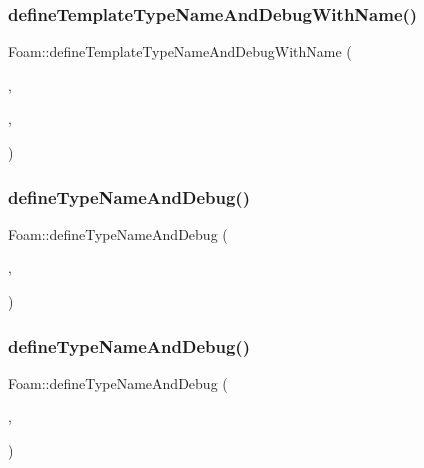 \mbox{\label{namespaceFoam_a8b6880a1c00667344278ee7d0f07e08f}} 
\subsubsection{\texorpdfstring{define\+Template\+Type\+Name\+And\+Debug\+With\+Name()}{defineTemplateTypeNameAndDebugWithName()}}
{\footnotesize\ttfamily Foam\+::define\+Template\+Type\+Name\+And\+Debug\+With\+Name (\begin{DoxyParamCaption}\item[{\hyperlink{namespaceFoam_adbfd1f3f51dc7617aa2c901685a43266}{scalar\+I\+O\+Field\+Field}}]{,  }\item[{\char`\"{}scalar\+Field\+Field\char`\"{}}]{,  }\item[{0}]{ }\end{DoxyParamCaption})}

\mbox{\label{namespaceFoam_a40acadd72aae4ec664a4d929f6a7a03c}} 
\subsubsection{\texorpdfstring{define\+Type\+Name\+And\+Debug()}{defineTypeNameAndDebug()}\hspace{0.1cm}{\footnotesize\ttfamily [12/50]}}
{\footnotesize\ttfamily Foam\+::define\+Type\+Name\+And\+Debug (\begin{DoxyParamCaption}\item[{\hyperlink{classFoam_1_1heatExchanger}{heat\+Exchanger}}]{,  }\item[{0}]{ }\end{DoxyParamCaption})}

\mbox{\label{namespaceFoam_ada763ab4438801dc5a90d723558d096c}} 
\subsubsection{\texorpdfstring{define\+Type\+Name\+And\+Debug()}{defineTypeNameAndDebug()}\hspace{0.1cm}{\footnotesize\ttfamily [13/50]}}
{\footnotesize\ttfamily Foam\+::define\+Type\+Name\+And\+Debug (\begin{DoxyParamCaption}\item[{\hyperlink{classFoam_1_1powerModel}{power\+Model}}]{,  }\item[{0}]{ }\end{DoxyParamCaption})}

